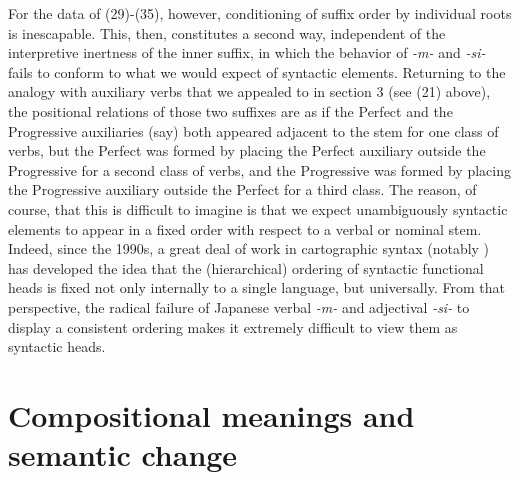 \documentclass[output=paper,
modfonts
]{LSP/langsci}
\begin{document}
For the data of (29)-(35), however, conditioning of suffix order by
individual roots is inescapable. This, then, constitutes a second way,
independent of the interpretive inertness of the inner suffix, in which
the behavior of \textit{-m-} and \textit{-si-} fails to conform to what we
would expect of syntactic elements. Returning to the analogy with
auxiliary verbs that we appealed to in section 3 (see (21) above), the
positional relations of those two suffixes are as if the Perfect and the
Progressive auxiliaries (say) both appeared adjacent to the stem for one
class of verbs, but the Perfect was formed by placing the Perfect
auxiliary outside the Progressive for a second class of verbs, and the
Progressive was formed by placing the Progressive auxiliary outside the
Perfect for a third class. The reason, of course, that this is difficult
to imagine is that we expect unambiguously syntactic elements to appear
in a fixed order with respect to a verbal or nominal stem. Indeed, since
the 1990s, a great deal of work in cartographic syntax (notably \citealt{cinque1999a}) has developed the idea that the (hierarchical) ordering of
syntactic functional heads is fixed not only internally to a single
language, but universally. From that perspective, the radical failure of
Japanese verbal \textit{-m-} and adjectival \textit{-si-} to display a
consistent ordering makes it extremely difficult to view them as
syntactic heads.

\section{Compositional meanings and semantic change}\label{composition}
\end{document}
